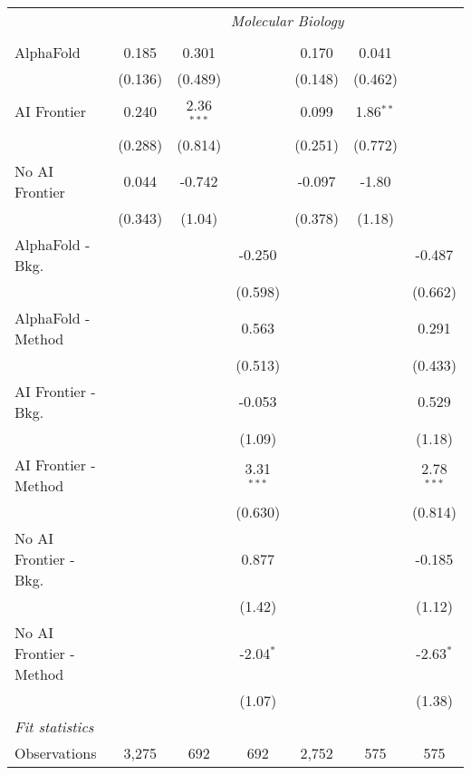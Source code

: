 \begin{tabular}{lcccccc}
 & \multicolumn{6}{c}{\textit{Molecular Biology}} \\ \\
   AlphaFold               & 0.185   & 0.301        &              & 0.170   & 0.041       &   \\   
                           & (0.136) & (0.489)      &              & (0.148) & (0.462)     &   \\   
   AI Frontier             & 0.240   & 2.36$^{***}$ &              & 0.099   & 1.86$^{**}$ &   \\   
                           & (0.288) & (0.814)      &              & (0.251) & (0.772)     &   \\   
   No AI Frontier          & 0.044   & -0.742       &              & -0.097  & -1.80       &   \\   
                           & (0.343) & (1.04)       &              & (0.378) & (1.18)      &   \\   
   AlphaFold - Bkg.        &         &              & -0.250       &         &             & -0.487\\   
                           &         &              & (0.598)      &         &             & (0.662)\\   
   AlphaFold - Method      &         &              & 0.563        &         &             & 0.291\\   
                           &         &              & (0.513)      &         &             & (0.433)\\   
   AI Frontier - Bkg.      &         &              & -0.053       &         &             & 0.529\\   
                           &         &              & (1.09)       &         &             & (1.18)\\   
   AI Frontier - Method    &         &              & 3.31$^{***}$ &         &             & 2.78$^{***}$\\   
                           &         &              & (0.630)      &         &             & (0.814)\\   
   No AI Frontier - Bkg.   &         &              & 0.877        &         &             & -0.185\\   
                           &         &              & (1.42)       &         &             & (1.12)\\   
   No AI Frontier - Method &         &              & -2.04$^{*}$  &         &             & -2.63$^{*}$\\   
                           &         &              & (1.07)       &         &             & (1.38)\\   
   \midrule
   \emph{Fit statistics}\\
   Observations            & 3,275   & 692          & 692          & 2,752   & 575         & 575\\  
   

\end{tabular}
